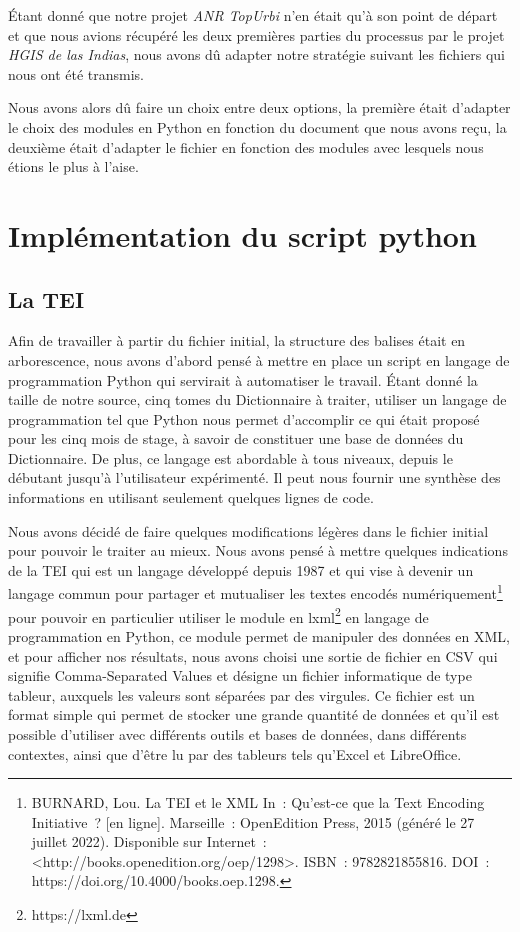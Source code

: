 \documentclass[a4paper,12pt,twoside]{book}
\begin{document}
Étant donné que notre projet \textit{ANR TopUrbi} n’en était qu’à son point de départ et que nous avions récupéré les deux premières parties du processus par le projet \textit{HGIS de las Indias}, nous avons dû adapter notre stratégie suivant les fichiers qui nous ont été transmis. 
	
Nous avons alors dû faire un choix entre deux options, la première était d’adapter le choix des modules en Python en fonction du document que nous avons reçu, la deuxième était d’adapter le fichier  en fonction des modules avec lesquels nous étions le plus à l’aise.
	
\section{Implémentation du script python}

\subsection{La TEI}

Afin de travailler à partir du fichier initial, la structure des balises était en arborescence, nous avons d’abord pensé à mettre en place un script en langage de programmation Python qui servirait à automatiser le travail. Étant donné la taille de notre source, cinq tomes du Dictionnaire à traiter, utiliser un langage de programmation tel que Python nous permet d’accomplir ce qui était proposé pour les cinq mois de stage, à savoir de constituer une base de données du Dictionnaire. De plus, ce langage est abordable à tous niveaux, depuis le débutant jusqu’à l’utilisateur expérimenté. Il peut nous fournir une synthèse des informations en utilisant seulement quelques lignes de code.

Nous avons décidé de faire quelques modifications légères dans le fichier initial pour pouvoir le traiter au mieux. Nous avons pensé à mettre quelques indications de la \Gls{TEI}  qui est un langage développé depuis 1987 et qui vise à devenir un langage commun pour partager et  mutualiser les textes encodés numériquement\footnote{BURNARD, Lou. La TEI et le XML In : Qu’est-ce que la Text Encoding Initiative ? [en ligne]. Marseille : OpenEdition Press, 2015 (généré le 27 juillet 2022). Disponible sur Internet : <http://books.openedition.org/oep/1298>. ISBN : 9782821855816. DOI : https://doi.org/10.4000/books.oep.1298.} pour pouvoir en particulier utiliser le module en lxml\footnote{https://lxml.de} en langage de programmation en Python, ce module permet de manipuler des données en XML, et pour afficher nos résultats, nous avons choisi une sortie de fichier en CSV qui  signifie Comma-Separated Values et désigne un fichier informatique de type tableur, auxquels les valeurs sont séparées par des virgules. Ce fichier est un format simple qui permet de stocker une grande quantité de données et qu’il est possible d’utiliser avec différents outils et bases de données, dans différents contextes, ainsi que d’être lu par des tableurs tels qu’Excel et LibreOffice.
\end{document}
